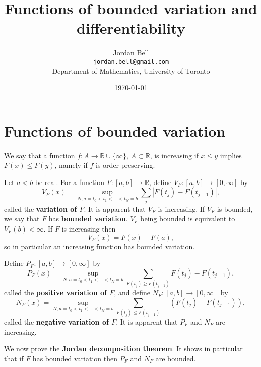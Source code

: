 \documentclass{article}
\theoremstyle{definition}
\begin{document}
\title{Functions of bounded variation and differentiability}
\author{Jordan Bell\\ \texttt{jordan.bell@gmail.com}\\Department of Mathematics, University of Toronto}
\date{\today}

\maketitle

\section{Functions of bounded variation}
We say that a function $f:A \to \mathbb{R} \cup \{\infty\}$, $A \subset \mathbb{R}$,
is 
increasing if $x \leq y$ implies $F(x) \leq F(y)$, namely if $f$ is order preserving. 

Let $a<b$ be real. For a function $F:[a,b] \to \mathbb{R}$, define $V_F:[a,b] \to [0,\infty]$ by
\[
V_F(x) = \sup_{N, a=t_0<t_1<\cdots<t_N=b} \sum_j |F(t_j)-F(t_{j-1})|,
\]
called the \textbf{variation of $F$}.
It is apparent that $V_F$ is increasing. If $V_F$ is bounded, we say that $F$ has \textbf{bounded variation}.  $V_F$
being bounded is equivalent to $V_F(b)<\infty$. If $F$ is increasing then
\[
V_F(x) = F(x)-F(a),
\]
so in particular an increasing function has bounded variation.


Define $P_F:[a,b] \to [0,\infty]$ by
\[
P_F(x) = \sup_{N, a=t_0<t_1<\cdots<t_N=b} \sum_{F(t_j) \geq F(t_{j-1})} F(t_j)-F(t_{j-1}),
\]
called the \textbf{positive variation of $F$}, and define
$N_F:[a,b] \to [0,\infty]$ by
\[
N_F(x) = \sup_{N, a=t_0<t_1<\cdots<t_N=b} \sum_{F(t_j) \leq F(t_{j-1})} -(F(t_j)-F(t_{j-1})),
\]
called the \textbf{negative variation of $F$}. It is apparent that $P_F$ and $N_F$ are increasing.

We now prove the \textbf{Jordan decomposition theorem}. It shows in particular that if $F$ has bounded variation then
$P_F$ and $N_F$ are bounded.
\end{document}
